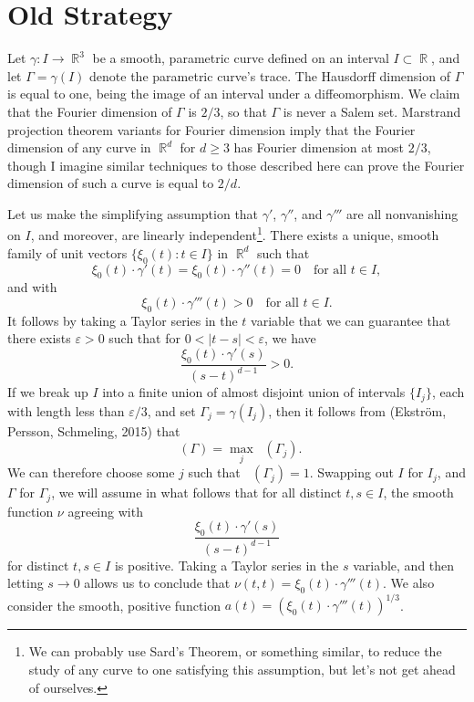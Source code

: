 \documentclass[dvipsnames,letterpaper,12pt]{article}
\DeclareMathOperator{\fordim}{\dim_{\mathbb{F}}}
\DeclareMathOperator{\RR}{\mathbb{R}}
\begin{document}
\section{Old Strategy}

Let $\gamma: I \to \RR^3$ be a smooth, parametric curve defined on an interval $I \subset \RR$, and let $\Gamma = \gamma(I)$ denote the parametric curve's trace. The Hausdorff dimension of $\Gamma$ is equal to one, being the image of an interval under a diffeomorphism. We claim that the Fourier dimension of $\Gamma$ is $2/3$, so that $\Gamma$ is never a Salem set. Marstrand projection theorem variants for Fourier dimension imply that the Fourier dimension of any curve in $\RR^d$ for $d \geq 3$ has Fourier dimension at most $2/3$, though I imagine similar techniques to those described here can prove the Fourier dimension of such a curve is equal to $2/d$.

Let us make the simplifying assumption that $\gamma'$, $\gamma''$, and $\gamma'''$ are all nonvanishing on $I$, and moreover, are linearly independent\footnote{We can probably use Sard's Theorem, or something similar, to reduce the study of any curve to one satisfying this assumption, but let's not get ahead of ourselves.}. There exists a unique, smooth family of unit vectors $\{ \xi_0(t) : t \in I \}$ in $\RR^d$ such that
%
\[ \xi_0(t) \cdot \gamma'(t) = \xi_0(t) \cdot \gamma''(t) = 0 \quad\text{for all $t \in I$}, \]
%
and with
%
\[ \xi_0(t) \cdot \gamma'''(t) > 0 \quad \text{for all $t \in I$}. \]
%
It follows by taking a Taylor series in the $t$ variable that we can guarantee that there exists $\varepsilon > 0$ such that for $0 < |t - s| < \varepsilon$, we have
%
\[ \frac{\xi_0(t) \cdot \gamma'(s)}{(s - t)^{d-1}} > 0. \]
%
If we break up $I$ into a finite union of almost disjoint union of intervals $\{ I_j \}$, each with length less than $\varepsilon / 3$, and set $\Gamma_j = \gamma(I_j)$, then it follows from (Ekstr\"{o}m, Persson, Schmeling, 2015) that
%
\[ \fordim(\Gamma) = \max_j \fordim(\Gamma_j). \]
%
We can therefore choose some $j$ such that $\fordim(\Gamma_j) = 1$. Swapping out $I$ for $I_j$, and $\Gamma$ for $\Gamma_j$, we will assume in what follows that for all distinct $t,s \in I$, the smooth function $\nu$ agreeing with
%
\[ \frac{\xi_0(t) \cdot \gamma'(s)}{(s - t)^{d-1}} \]
%
for distinct $t,s \in I$ is positive. Taking a Taylor series in the $s$ variable, and then letting $s \to 0$ allows us to conclude that $\nu(t,t) = \xi_0(t) \cdot \gamma'''(t)$. We also consider the smooth, positive function $a(t) = (\xi_0(t) \cdot \gamma'''(t))^{1/3}$.
\end{document}

